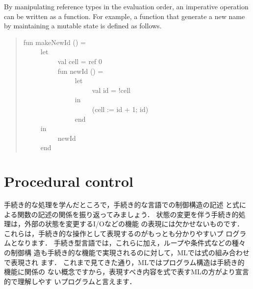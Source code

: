 \documentclass{jbook}
\newcommand{\txt}[2]{#2}
\newcommand{\myem}{\ \ \ \ \  }
\begin{document}
	By manipulating reference types in the evaluation order, 
an imperative operation can be written as a function.
	For example, a function that generate a new name by maintaining
a mutable state is defined as follows.
\begin{tt}
\begin{quote}
fun makeNewId () =\\
\myem let\\
\myem\myem val cell = ref 0\\
\myem\myem fun newId () =\\
\myem\myem\myem let\\
\myem\myem\myem\myem val id = !cell\\
\myem\myem\myem in\\
\myem\myem\myem\myem (cell := id + 1; id)\\
\myem\myem\myem end\\
\myem in\\
\myem\myem newId\\
\myem end
\end{quote}
\end{tt}
\fi%
	
\section{\txt{手続き的制御}{Procedural control}}
\label{sec:tutorialIteration}

\ifx\jp%
	手続き的な処理を学んだところで，手続き的な言語での制御構造の記述
と式による関数の記述の関係を振り返ってみましょう．
	状態の変更を伴う手続き的処理は，外部の状態を変更するI/Oなどの機能
の表現には欠かせないものです．
	これらは，手続き的な操作として表現するのがもっとも分かりやすいプ
ログラムとなります．
	手続き型言語では，これらに加え，ループや条件式などの種々の制御構
造も手続き的な機能で実現されるのに対して，MLでは式の組み合わせで表現され
ます．
	これまで見てきた通り，MLではプログラム構造は手続き的機能に関係の
ない概念ですから，表現すべき内容を式で表すMLの方がより宣言的で理解しやす
いプログラムと言えます．
\end{document}
